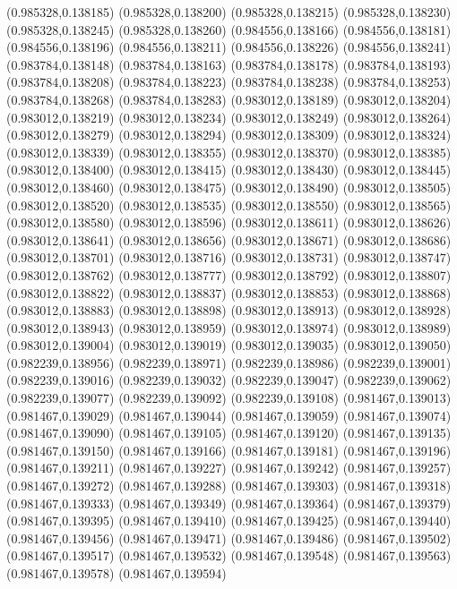 (0.985328,0.138185)
(0.985328,0.138200)
(0.985328,0.138215)
(0.985328,0.138230)
(0.985328,0.138245)
(0.985328,0.138260)
(0.984556,0.138166)
(0.984556,0.138181)
(0.984556,0.138196)
(0.984556,0.138211)
(0.984556,0.138226)
(0.984556,0.138241)
(0.983784,0.138148)
(0.983784,0.138163)
(0.983784,0.138178)
(0.983784,0.138193)
(0.983784,0.138208)
(0.983784,0.138223)
(0.983784,0.138238)
(0.983784,0.138253)
(0.983784,0.138268)
(0.983784,0.138283)
(0.983012,0.138189)
(0.983012,0.138204)
(0.983012,0.138219)
(0.983012,0.138234)
(0.983012,0.138249)
(0.983012,0.138264)
(0.983012,0.138279)
(0.983012,0.138294)
(0.983012,0.138309)
(0.983012,0.138324)
(0.983012,0.138339)
(0.983012,0.138355)
(0.983012,0.138370)
(0.983012,0.138385)
(0.983012,0.138400)
(0.983012,0.138415)
(0.983012,0.138430)
(0.983012,0.138445)
(0.983012,0.138460)
(0.983012,0.138475)
(0.983012,0.138490)
(0.983012,0.138505)
(0.983012,0.138520)
(0.983012,0.138535)
(0.983012,0.138550)
(0.983012,0.138565)
(0.983012,0.138580)
(0.983012,0.138596)
(0.983012,0.138611)
(0.983012,0.138626)
(0.983012,0.138641)
(0.983012,0.138656)
(0.983012,0.138671)
(0.983012,0.138686)
(0.983012,0.138701)
(0.983012,0.138716)
(0.983012,0.138731)
(0.983012,0.138747)
(0.983012,0.138762)
(0.983012,0.138777)
(0.983012,0.138792)
(0.983012,0.138807)
(0.983012,0.138822)
(0.983012,0.138837)
(0.983012,0.138853)
(0.983012,0.138868)
(0.983012,0.138883)
(0.983012,0.138898)
(0.983012,0.138913)
(0.983012,0.138928)
(0.983012,0.138943)
(0.983012,0.138959)
(0.983012,0.138974)
(0.983012,0.138989)
(0.983012,0.139004)
(0.983012,0.139019)
(0.983012,0.139035)
(0.983012,0.139050)
(0.982239,0.138956)
(0.982239,0.138971)
(0.982239,0.138986)
(0.982239,0.139001)
(0.982239,0.139016)
(0.982239,0.139032)
(0.982239,0.139047)
(0.982239,0.139062)
(0.982239,0.139077)
(0.982239,0.139092)
(0.982239,0.139108)
(0.981467,0.139013)
(0.981467,0.139029)
(0.981467,0.139044)
(0.981467,0.139059)
(0.981467,0.139074)
(0.981467,0.139090)
(0.981467,0.139105)
(0.981467,0.139120)
(0.981467,0.139135)
(0.981467,0.139150)
(0.981467,0.139166)
(0.981467,0.139181)
(0.981467,0.139196)
(0.981467,0.139211)
(0.981467,0.139227)
(0.981467,0.139242)
(0.981467,0.139257)
(0.981467,0.139272)
(0.981467,0.139288)
(0.981467,0.139303)
(0.981467,0.139318)
(0.981467,0.139333)
(0.981467,0.139349)
(0.981467,0.139364)
(0.981467,0.139379)
(0.981467,0.139395)
(0.981467,0.139410)
(0.981467,0.139425)
(0.981467,0.139440)
(0.981467,0.139456)
(0.981467,0.139471)
(0.981467,0.139486)
(0.981467,0.139502)
(0.981467,0.139517)
(0.981467,0.139532)
(0.981467,0.139548)
(0.981467,0.139563)
(0.981467,0.139578)
(0.981467,0.139594)
